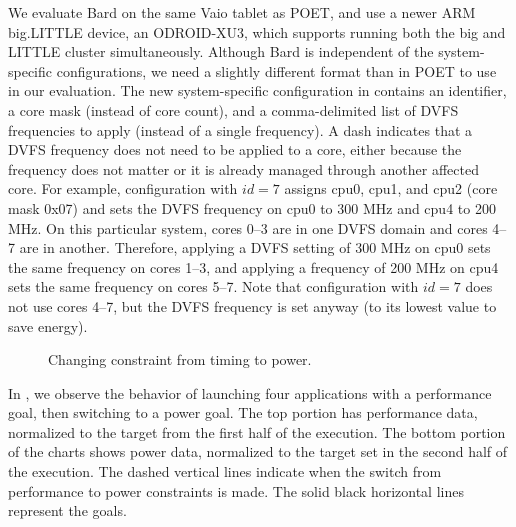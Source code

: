 We evaluate Bard on the same Vaio tablet as POET, and use a newer ARM big.LITTLE device, an ODROID-XU3, which supports running both the big and LITTLE cluster simultaneously.
Although Bard is independent of the system-specific configurations, we need a slightly different format than in POET to use in our evaluation.
The new system-specific configuration in  contains an identifier, a core mask (instead of core count), and a comma-delimited list of DVFS frequencies to apply (instead of a single frequency).
A dash indicates that a DVFS frequency does not need to be applied to a core, either because the frequency does not matter or it is already managed through another affected core.
For example, configuration with $id=7$ assigns cpu0, cpu1, and cpu2 (core mask 0x07) and sets the DVFS frequency on cpu0 to 300 MHz and cpu4 to 200 MHz.
On this particular system, cores 0--3 are in one DVFS domain and cores 4--7 are in another.
Therefore, applying a DVFS setting of 300 MHz on cpu0 sets the same frequency on cores 1--3, and applying a frequency of 200 MHz on cpu4 sets the same frequency on cores 5--7.
Note that configuration with $id=7$ does not use cores 4--7, but the DVFS frequency is set anyway (to its lowest value to save energy).

\begin{figure}[t]
  \centering
    
  \caption{Changing constraint from timing to power.}
  \label{fig:bard-perf-pwr-change-pick4}
\end{figure}

In , we observe the behavior of launching four applications with a performance goal, then switching to a power goal.
The top portion has performance data, normalized to the target from the first half of the execution.
The bottom portion of the charts shows power data, normalized to the target set in the second half of the execution.
The dashed vertical lines indicate when the switch from performance to power constraints is made.
The solid black horizontal lines represent the goals.

